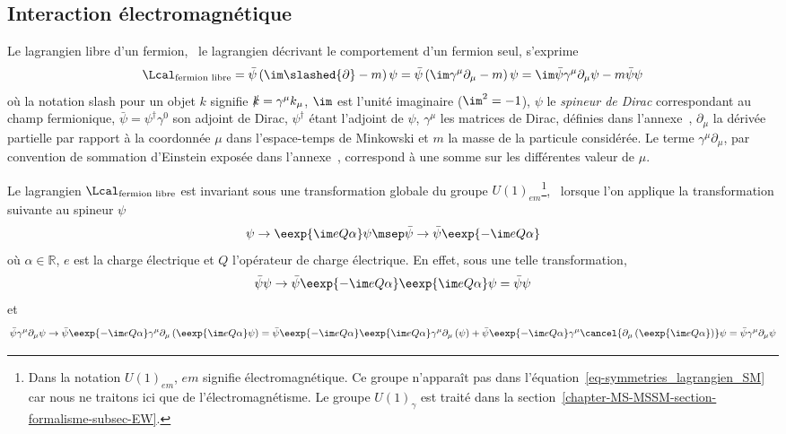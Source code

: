 \subsection{Interaction électromagnétique}\label{chapter-MS-MSSM-section-formalisme-subsec-QED}
Le lagrangien libre d'un fermion, \ie\ le lagrangien décrivant le comportement d'un fermion seul, s'exprime
\begin{equation}
\Lcal_{\text{fermion libre}}
= \bar{\psi} \left( \im\slashed{\partial} - m \right) \psi
= \bar{\psi} \left( \im \gamma^\mu\partial_\mu - m \right) \psi
= \im \bar{\psi} \gamma^\mu\partial_\mu \psi - m \bar{\psi}\psi
\label{eq-lagrangien_fermion_libre_partial}
\end{equation}
où la notation \og slash \fg{} pour un objet $k$ signifie $\slashed{k} = \gamma^\mu k_\mu$, $\im$ est l'unité imaginaire ($\im^2=-1$), $\psi$ le \emph{spineur de Dirac} correspondant au champ fermionique, $\bar{\psi}=\psi^\dagger\gamma^0$ son adjoint de Dirac, $\psi^\dagger$ étant l'adjoint de $\psi$, $\gamma^\mu$ les matrices de Dirac, définies dans l'annexe~, $\partial_\mu$ la dérivée partielle par rapport à la coordonnée $\mu$ dans l'espace-temps de Minkowski et $m$ la masse de la particule considérée.
Le terme $\gamma^\mu \partial_\mu$, par convention de sommation d'Einstein exposée dans l'annexe~, correspond à une somme sur les différentes valeur de $\mu$.
\par Le lagrangien $\Lcal_{\text{fermion libre}}$ est invariant sous une transformation globale du groupe $U(1)_{em}$\footnote{Dans la notation $U(1)_{em}$, \og $em$ \fg{} signifie électromagnétique. Ce groupe n'apparaît pas dans l'équation~\eqref{eq-symmetries_lagrangien_SM} car nous ne traitons ici que de l'électromagnétisme. Le groupe $U(1)_\gamma$ est traité dans la section~\ref{chapter-MS-MSSM-section-formalisme-subsec-EW}.}, \ie\ lorsque l'on applique la transformation suivante au spineur $\psi$
\begin{equation}
\psi \to \eexp{\im eQ\alpha}\psi
\msep
\bar{\psi} \to \bar{\psi}\eexp{-\im eQ\alpha}
\end{equation}
où $\alpha\in\mathbb{R}$, $e$ est la charge électrique et $Q$ l'opérateur de charge électrique.
En effet, sous une telle transformation,
\begin{equation}
\bar{\psi}\psi \to \bar{\psi}\eexp{-\im eQ\alpha}\eexp{\im eQ\alpha}\psi = \bar{\psi}\psi
\end{equation}
et
\begin{equation}
\bar{\psi} \gamma^\mu\partial_\mu \psi
\to
\bar{\psi}\eexp{-\im eQ\alpha}
\gamma^\mu\partial_\mu
\left(\eexp{\im eQ\alpha}\psi\right)
=
\bar{\psi}\eexp{-\im eQ\alpha}
\eexp{\im eQ\alpha}
\gamma^\mu\partial_\mu
\left(\psi\vphantom{\psi\eexp{\im eQ\alpha}}\right)
+
\bar{\psi}\eexp{-\im eQ\alpha}
\gamma^\mu
\cancel{\partial_\mu \left(\eexp{\im eQ\alpha}\vphantom{\psi\eexp{\im eQ\alpha}}\right)}\psi
= \bar{\psi} \gamma^\mu\partial_\mu \psi
\end{equation}
